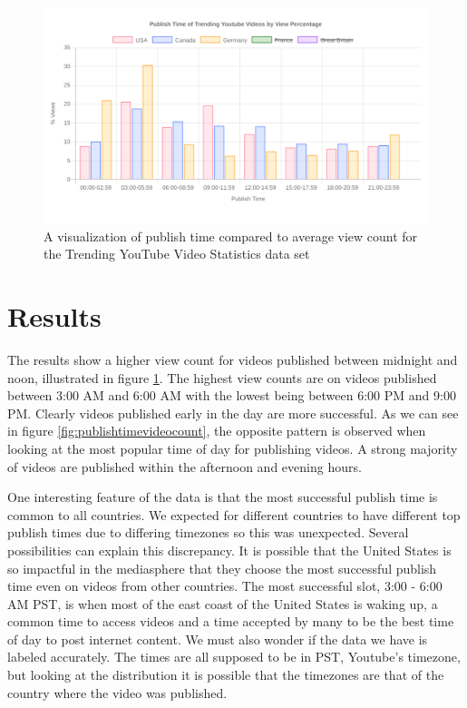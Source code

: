 \documentclass[journal]{vgtc}                %
\begin{document}
\begin{figure}[tb]
	\centering %
	\includegraphics[width=1\columnwidth]{publishtimeviews}
	\caption{A visualization of publish time compared to average view count for the Trending YouTube Video Statistics data set}
	\label{fig:publishtimeviews}
\end{figure}

\section{Results}

The results show a higher view count for videos published between midnight and noon, illustrated in figure \ref{fig:publishtimeviews}. The highest view counts are on videos published between 3:00 AM and 6:00 AM with the lowest being between 6:00 PM and 9:00 PM. Clearly videos published early in the day are more successful. As we can see in figure \ref{fig:publishtimevideocount}, the opposite pattern is observed when looking at the most popular time of day for publishing videos. A strong majority of videos are published within the afternoon and evening hours.

One interesting feature of the data is that the most successful publish time is common to all countries. We expected for different countries to have different top publish times due to differing timezones so this was unexpected. Several possibilities can explain this discrepancy. It is possible that the United States is so impactful in the mediasphere that they choose the most successful publish time even on videos from other countries.  The most successful slot, 3:00 - 6:00 AM PST, is when most of the east coast of the United States is waking up, a common time to access videos and a time accepted by many to be the best time of day to post internet content. We must also wonder if the data we have is labeled accurately. The times are all supposed to be in PST, Youtube's timezone, but looking at the distribution it is possible that the timezones are that of the country where the video was published.
\end{document}
